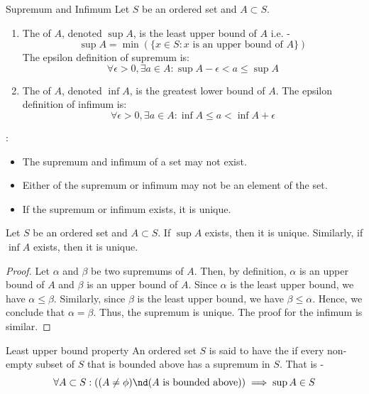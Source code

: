 \documentclass[openany]{book}
\begin{document}
\begin{mydefinition}{Supremum and Infimum}
    Let $S$ be an ordered set and $A \subset S$.
    \begin{enumerate}
        \item The  of $A$, denoted $\sup A$, is the least upper bound of $A$ i.e. - 
        $$\sup A = \min ( \{x \in S : x \text{ is an upper bound of } A \} )$$
        The epsilon definition of supremum is:
        $$\forall \epsilon > 0, \exists a \in A: \sup A - \epsilon < a \leq \sup A$$
        \item The  of $A$, denoted $\inf A$, is the greatest lower bound of $A$.
        The epsilon definition of infimum is:
        $$\forall \epsilon > 0, \exists a \in A: \inf A \leq a < \inf A + \epsilon$$
    \end{enumerate}
\end{mydefinition}
\begin{mynote}
: 
\begin{itemize}
    \item The supremum and infimum of a set may not exist. 
    \item Either of the supremum or infimum may not be an element of the set.
    \item If the supremum or infimum exists, it is unique.
\end{itemize}
\end{mynote}
\begin{mytheorem}
    Let $S$ be an ordered set and $A \subset S$. If $\sup A$ exists, then it is unique. Similarly, if $\inf A$ exists, then it is unique.
\end{mytheorem}
\begin{proof}
    Let $\alpha$ and $\beta$ be two supremums of $A$. Then, by definition, $\alpha$ is an upper bound of $A$ and $\beta$ is an upper bound of $A$. Since $\alpha$ is the least upper bound, we have $\alpha \leq \beta$. Similarly, since $\beta$ is the least upper bound, we have $\beta \leq \alpha$. Hence, we conclude that $\alpha = \beta$. Thus, the supremum is unique. The proof for the infimum is similar.
\end{proof}
\begin{mydefinition}{Least upper bound property}
    An ordered set $S$ is said to have the  if every non-empty subset of $S$ that is bounded above has a supremum in $S$. That is - 
    $$\forall A \subset S: ((A \neq \phi) \nd (A \text{ is bounded above})) \implies \sup A \in S$$
\end{mydefinition}
\end{document}

